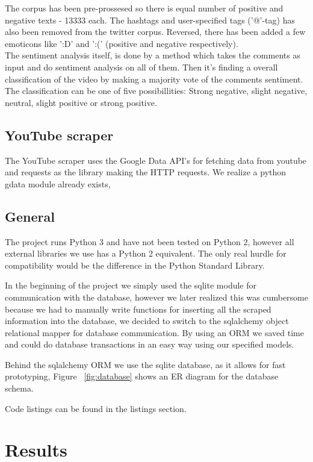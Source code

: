 \documentclass[conference]{IEEEtran}
\begin{document}
The corpus has been pre-prossesed so there is equal number of positive and negative texts - 13333 each. The hashtags and user-specified tags ('@'-tag) has also been removed from the twitter corpus. Reversed, there has been added a few emoticons like ':D' and ':(' (positive and negative respectively).\\

The sentiment analysis itself, is done by a method which takes the comments as input and do sentiment analysis on all of them. Then it's finding a overall classification of the video by making a majority vote of the comments sentiment. The classification can be one of five possibillities: Strong negative, slight negative, neutral, slight positive or strong positive.


\subsection{YouTube scraper}
The YouTube scraper uses the Google Data API's for fetching data from youtube and requests as the library making the HTTP requests. We realize a python gdata module already exists, 

\subsection{General}
The project runs Python 3 and have not been tested on Python 2,
however all external libraries we use has a Python 2 equivalent. 
The only real hurdle for compatibility would be the difference in the Python Standard Library.

In the beginning of the project we simply used the sqlite \cite{sqllite} module for communication with the database, however we later realized this was cumbersome because we had to manually write functions for inserting all the scraped information into the database, we decided to switch to the sqlalchemy object relational mapper \cite{sqlalchemy} for database communication. By using an ORM we saved time and could do database transactions in an easy way using our specified models.

Behind the sqlalchemy ORM we use the sqlite database, as it allows for fast prototyping, Figure ~\ref{fig:database} shows an ER diagram for the database schema.

Code listings can be found in the listings section.

\section{Results}
\end{document}
